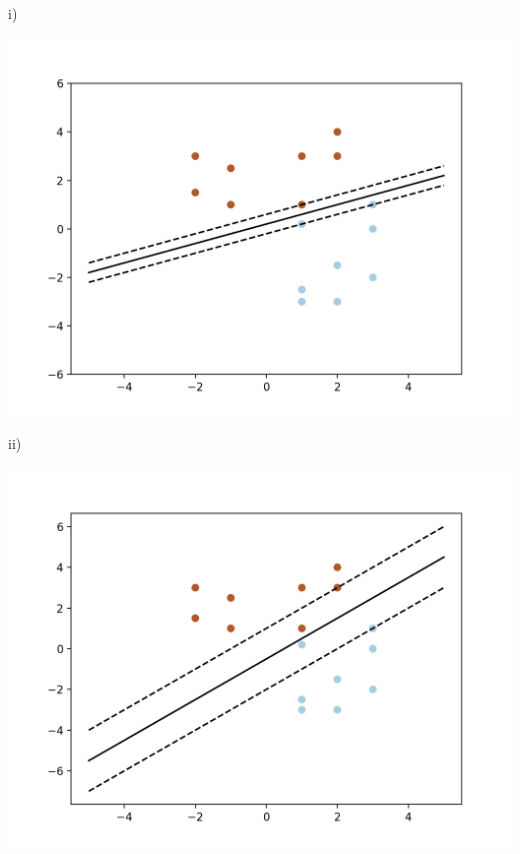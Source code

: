 \documentclass[11pt,letterpaper]{article}
\begin{document}
\begin{enumerate}
\begin{center}

\end{center}

\begin{solution}

\vspace{\baselineskip}

i)
\begin{center}
\includegraphics[scale = .8]{hard_margin.png}
\end{center}
ii)
\begin{center}
\includegraphics[scale = .8]{soft_margin.png}
\end{center}


\end{solution}
\end{enumerate}
\end{document}
